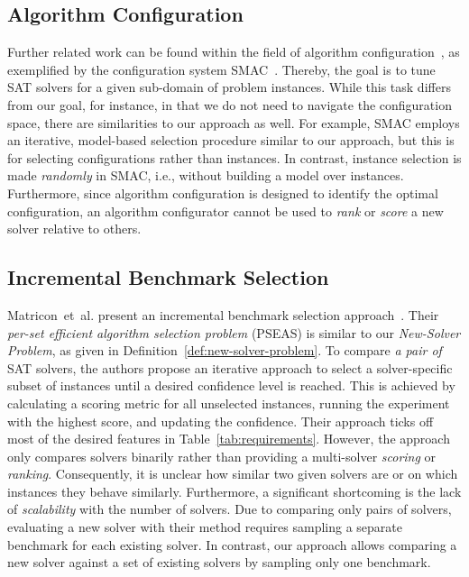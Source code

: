 \documentclass[sn-basic, Numbered]{sn-jnl} %
\begin{document}
\subsection{Algorithm Configuration}
\label{sec:related:algo-configuration}

Further related work can be found within the field of algorithm configuration~\cite{HoosHL21,Stutzle0P22}, as exemplified by the configuration system SMAC~\cite{HutterHL11}.
Thereby, the goal is to tune SAT solvers for a given sub-domain of problem instances.
While this task differs from our goal, for instance, in that we do not need to navigate the configuration space, there are similarities to our approach as well.
For example, SMAC employs an iterative, model-based selection procedure similar to our approach, but this is for selecting configurations rather than instances.
In contrast, instance selection is made \emph{randomly} in SMAC, i.e., without building a model over instances.
Furthermore, since algorithm configuration is designed to identify the optimal configuration, an algorithm configurator cannot be used to \emph{rank} or \emph{score} a new solver relative to others.

\subsection{Incremental Benchmark Selection}
\label{sec:related:incremental-selection}

Matricon~et~al. present an incremental benchmark selection approach~\cite{MatriconAFSH21}.
Their \emph{per-set efficient algorithm selection problem} (PSEAS) is similar to our \emph{New-Solver Problem}, as given in Definition~\ref{def:new-solver-problem}.
To compare \emph{a pair of} SAT solvers, the authors propose an iterative approach to select a solver-specific subset of instances until a desired confidence level is reached.
This is achieved by calculating a scoring metric for all unselected instances, running the experiment with the highest score, and updating the confidence.
Their approach ticks off most of the desired features in Table~\ref{tab:requirements}.
However, the approach only compares solvers binarily rather than providing a multi-solver \emph{scoring} or \emph{ranking}.
Consequently, it is unclear how similar two given solvers are or on which instances they behave similarly.
Furthermore, a significant shortcoming is the lack of \emph{scalability} with the number of solvers.
Due to comparing only pairs of solvers, evaluating a new solver with their method requires sampling a separate benchmark for each existing solver.
In contrast, our approach allows comparing a new solver against a set of existing solvers by sampling only one benchmark.
\end{document}
